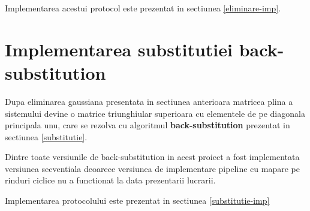 Implementarea acestui protocol este prezentat in sectiunea
\ref{eliminare-imp}.

\section{Implementarea substitutiei {\bf back-substitution}}

\hspace{5mm}Dupa eliminarea gaussiana presentata in sectiunea anterioara
matricea plina a sistemului devine o matrice triunghiular superioara cu
elementele de pe diagonala principala unu, care se rezolva cu algoritmul
{\bf back-substitution} prezentat in sectiunea \ref{substitutie}.

Dintre toate versiunile de back-substitution in acest proiect a fost
implementata versiunea secventiala deoarece versiunea de implementare
pipeline cu mapare pe rinduri ciclice nu a functionat la data prezentarii
lucrarii.

Implementarea protocolului este prezentat in sectiunea \ref{substitutie-imp}
